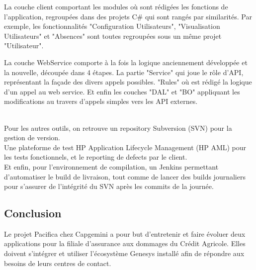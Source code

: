 \documentclass{rapport}
\begin{document}
\begin{minipage}{0.35\textwidth}
\end{minipage}
\begin{minipage}{0.55\textwidth}
La couche client comportant les modules où sont rédigées les fonctions de l'application, regroupées dans des projets C\# qui sont rangés par similarités. Par exemple, les fonctionnalités "Configuration Utilisateurs", "Visualisation Utilisateurs" et "Absences" sont toutes regroupées sous un même projet "Utilisateur".
\end{minipage}
\vspace{5mm} %

\begin{minipage}{0.35\textwidth}
\end{minipage}
\begin{minipage}{0.55\textwidth}
La couche WebService comporte à la fois la logique anciennement développée et la nouvelle, découpée dans 4 étapes. La partie "Service" qui joue le rôle d'API, représentant la façade des divers appels possibles. "Rules" où est rédigé la logique d'un appel au web service. Et enfin les couches "DAL" et "BO" appliquant les modifications au travers d'appels simples vers les API externes.
\end{minipage}
\vspace{5mm} %
\\

Pour les autres outils, on retrouve un repository Subversion (SVN) pour la gestion de version.\\
Une plateforme de test HP Application Lifecycle Management (HP AML) pour les tests fonctionnels, et le reporting de defects par le client.\\
Et enfin, pour l'environnement de compilation, un Jenkins permettant d'automatiser le build de livraison, tout comme de lancer des builds journaliers pour s'assurer de l'intégrité du SVN après les commits de la journée.

\subsection*{Conclusion}

Le projet Pacifica chez Capgemini a pour but d'entretenir et faire évoluer deux applications pour la filiale d'assurance aux dommages du Crédit Agricole. Elles doivent s'intégrer et utiliser l'écosystème Genesys installé  afin de répondre aux besoins de leurs centres de contact.\\
\end{document}
